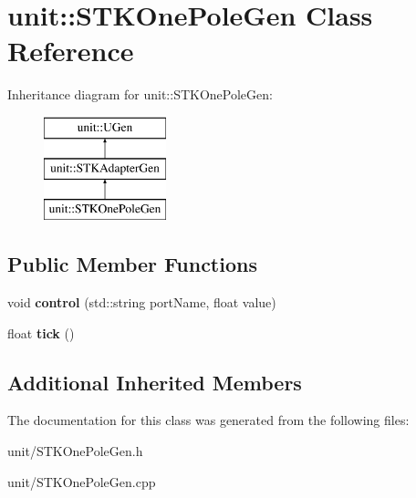 \hypertarget{classunit_1_1STKOnePoleGen}{}\section{unit\+:\+:S\+T\+K\+One\+Pole\+Gen Class Reference}
\label{classunit_1_1STKOnePoleGen}
Inheritance diagram for unit\+:\+:S\+T\+K\+One\+Pole\+Gen\+:\begin{figure}[H]
\begin{center}
\leavevmode
\includegraphics[height=3.000000cm]{classunit_1_1STKOnePoleGen}
\end{center}
\end{figure}
\subsection*{Public Member Functions}
\begin{DoxyCompactItemize}
\item 
void {\bfseries control} (std\+::string port\+Name, float value)\hypertarget{classunit_1_1STKOnePoleGen_abafc7a64770438cbde61518a7cf2d94b}{}\label{classunit_1_1STKOnePoleGen_abafc7a64770438cbde61518a7cf2d94b}

\item 
float {\bfseries tick} ()\hypertarget{classunit_1_1STKOnePoleGen_a3bc702fbc334d94eebd409755d1d74e8}{}\label{classunit_1_1STKOnePoleGen_a3bc702fbc334d94eebd409755d1d74e8}

\end{DoxyCompactItemize}
\subsection*{Additional Inherited Members}


The documentation for this class was generated from the following files\+:\begin{DoxyCompactItemize}
\item 
unit/S\+T\+K\+One\+Pole\+Gen.\+h\item 
unit/S\+T\+K\+One\+Pole\+Gen.\+cpp\end{DoxyCompactItemize}
